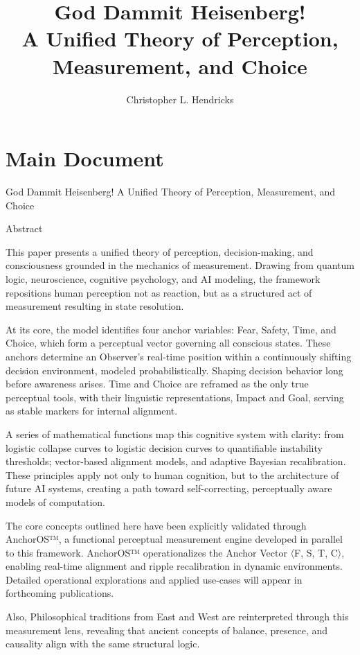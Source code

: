 \documentclass[12pt]{article}
\title{God Dammit Heisenberg! \\ A Unified Theory of Perception, Measurement, and Choice}
\author{Christopher L. Hendricks}
\date{}
\begin{document}
\maketitle

\section*{Main Document}

God Dammit Heisenberg!
A Unified Theory of Perception, Measurement, and Choice

Abstract

This paper presents a unified theory of perception, decision-making, and consciousness grounded in the mechanics of measurement. Drawing from quantum logic, neuroscience, cognitive psychology, and AI modeling, the framework repositions human perception not as reaction, but as a structured act of measurement resulting in state resolution.

At its core, the model identifies four anchor variables: Fear, Safety, Time, and Choice, which form a perceptual vector governing all conscious states. These anchors determine an Observer’s real-time position within a continuously shifting decision environment, modeled probabilistically. Shaping decision behavior long before awareness arises. Time and Choice are reframed as the only true perceptual tools, with their linguistic representations, Impact and Goal, serving as stable markers for internal alignment.

A series of mathematical functions map this cognitive system with clarity: from logistic collapse curves to logistic decision curves to quantifiable instability thresholds; vector-based alignment models, and adaptive Bayesian recalibration. These principles apply not only to human cognition, but to the architecture of future AI systems, creating a path toward self-correcting, perceptually aware models of computation.

The core concepts outlined here have been explicitly validated through AnchorOS™, a functional perceptual measurement engine developed in parallel to this framework. AnchorOS™ operationalizes the Anchor Vector 〈F, S, T, C〉, enabling real-time alignment and ripple recalibration in dynamic environments. Detailed operational explorations and applied use-cases will appear in forthcoming publications.

Also, Philosophical traditions from East and West are reinterpreted through this measurement lens, revealing that ancient concepts of balance, presence, and causality align with the same structural logic.
\end{document}
